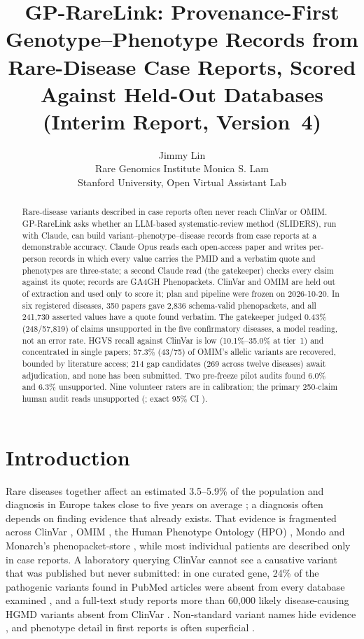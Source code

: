 \documentclass{article} %
\title{GP-RareLink: Provenance-First Genotype--Phenotype Records from Rare-Disease Case Reports, Scored Against Held-Out Databases (Interim Report, Version~4)}
\author{Jimmy Lin \\
Rare Genomics Institute
\And
Monica S. Lam \\
Stanford University, Open Virtual Assistant Lab
}
\begin{document}
\maketitle

\begin{abstract}
Rare-disease variants described in case reports often never reach ClinVar or OMIM. GP-RareLink asks whether an LLM-based systematic-review method (SLIDERS), run with Claude, can build variant--phenotype--disease records from case reports at a demonstrable accuracy. Claude Opus reads each open-access paper and writes per-person records in which every value carries the PMID and a verbatim quote and phenotypes are three-state; a second Claude read (the gatekeeper) checks every claim against its quote; records are GA4GH Phenopackets. ClinVar and OMIM are held out of extraction and used only to score it; plan and pipeline were frozen on 2026-10-20. In six registered diseases, 350 papers gave 2,836 schema-valid phenopackets, and all 241,730 asserted values have a quote found verbatim. The gatekeeper judged 0.43\% (248/57,819) of claims unsupported in the five confirmatory diseases, a model reading, not an error rate. HGVS recall against ClinVar is low (10.1\%--35.0\% at tier~1) and concentrated in single papers; 57.3\% (43/75) of OMIM's allelic variants are recovered, bounded by literature access; 214 gap candidates (269 across twelve diseases) await adjudication, and none has been submitted. Two pre-freeze pilot audits found 6.0\% and 6.3\% unsupported. Nine volunteer raters are in calibration; the primary 250-claim human audit reads  unsupported (; exact 95\% CI ).
\end{abstract}

\section{Introduction}
\label{sec:intro}
Rare diseases together affect an estimated 3.5--5.9\% of the population \citep{Wakap2019EstimatingCumulative} and diagnosis in Europe takes close to five years on average \citep{Faye2024TimeDiagnosis}; a diagnosis often depends on finding evidence that already exists. That evidence is fragmented across ClinVar \citep{landrum2025_clinvar}, OMIM \citep{amberger2019_omim}, the Human Phenotype Ontology (HPO) \citep{gargano2024_hpo}, Mondo \citep{vasilevsky2025_mondo} and Monarch's phenopacket-store \citep{danis2025_phenopacket_store}, while most individual patients are described only in case reports. A laboratory querying ClinVar cannot see a causative variant that was published but never submitted: in one curated gene, 24\% of the pathogenic variants found in PubMed articles were absent from every database examined \citep{Lyons2023RareDisease}, and a full-text study reports more than 60,000 likely disease-causing HGMD variants absent from ClinVar \citep{birgmeier2020_avada}. Non-standard variant names hide evidence \citep{freeman2024_vv_literature,lansdon2026_nomenclature_errors}, and phenotype detail in first reports is often superficial \citep{almail2024_reporting_gaps}.
\end{document}
